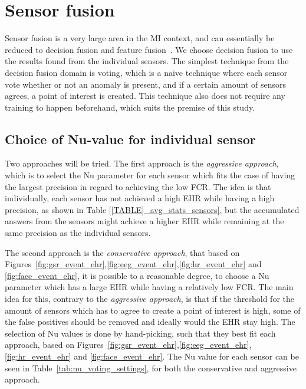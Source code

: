 \section{Sensor fusion}
Sensor fusion is a very large area in the MI context, and can essentially be reduced to decision fusion and feature fusion~\cite{fusion_techniques}.
We choose decision fusion to use the results found from the individual sensors.
The simplest technique from the decision fusion domain is voting, which is a naive technique where each sensor vote whether or not an anomaly is present, and if a certain amount of sensors agrees, a point of interest is created. This technique also does not require any training to happen beforehand, which suits the premise of this study.

\subsection{Choice of Nu-value for individual sensor}
Two approaches will be tried. The first approach is the \textit{aggressive approach}, which is to select the Nu
parameter for each sensor which fits the case of having the largest precision in regard to achieving the low FCR.
The idea is that individually, each sensor has not achieved a high EHR while having a high precision, as shown in Table
\ref{[TABLE]_avg_stats_sensors}, but the accumulated answers from the sensors might achieve a higher EHR while remaining
at the same precision as the individual sensors.

The second approach is the \textit{conservative approach}, that based on
Figures~\ref{fig:gsr_event_ehr},\ref{fig:eeg_event_ehr},\ref{fig:hr_event_ehr} and \ref{fig:face_event_ehr}, it is
possible to a reasonable degree, to choose a Nu parameter which has a large EHR while having a relatively low FCR. The
main idea for this, contrary to the \textit{aggressive approach}, is that if the threshold for the amount of sensors which has to agree to create a point of interest is high, some of the false positives should be removed and ideally would the EHR stay high.
The selection of Nu values is done by hand-picking, such that they best fit each approach, based on Figures~\ref{fig:gsr_event_ehr},\ref{fig:eeg_event_ehr},\ref{fig:hr_event_ehr} and \ref{fig:face_event_ehr}.
The Nu value for each sensor can be seen in Table~\ref{tab:nu_voting_settings}, for both the conservative and aggressive approach.

